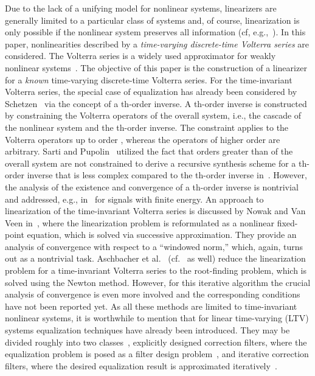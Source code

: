 \documentclass[10pt,twocolumn,twoside]{IEEEtran}
\begin{document}
Due to the lack of a unifying model for nonlinear systems, linearizers
are generally limited to a particular class of systems and, of course, linearization
is only possible if the nonlinear system preserves all information
(cf, e.g.,~\cite{geiger2011}). In this paper, nonlinearities
described by a \emph{time-varying discrete-time Volterra series} are considered. The
Volterra series is a widely used approximator for weakly nonlinear
systems~\cite{schetzen1980,rugh1981,mathews2000}. The objective of this paper is
the construction of a linearizer for a \emph{known} time-varying
discrete-time Volterra series. 
For the time-invariant Volterra series, the special case of equalization has already been
considered by Schetzen~\cite{schetzen1976} via the concept of a th-order inverse.
A th-order inverse is constructed by constraining the Volterra operators of the
overall system, i.e., the cascade of the nonlinear system and the th-order inverse. The
constraint applies to the Volterra operators up to order , whereas the operators
of higher order are arbitrary. Sarti and Pupolin~\cite{sarti1992} utilized
the fact that orders greater than  of the overall system are not constrained
to derive a recursive synthesis scheme for a th-order inverse that is less
complex compared to the th-order inverse in~\cite{schetzen1976}. However,
the analysis of the existence and convergence of a th-order inverse is
nontrivial and addressed, e.g., in~\cite{fang2001} for signals with finite energy.
An approach to linearization of the time-invariant Volterra series
is discussed by Nowak and Van Veen in~\cite{nowak1997}, where the
linearization problem is reformulated as a nonlinear fixed-point equation, which
is solved via successive approximation. They provide
an analysis of convergence with respect to a ``windowed  norm,'' which, again,
turns out as a nontrivial task. Aschbacher et al.~\cite{aschbacher2004} (cf.~\cite{redfern1998} as well)
reduce the linearization problem for a time-invariant Volterra series to
the root-finding problem, which is solved using the Newton method. However,
for this iterative algorithm the crucial analysis of convergence is even more
involved and the corresponding conditions have not been reported yet.
As all these methods are limited to time-invariant nonlinear systems, it is worthwhile
to mention that for linear time-varying (LTV) systems equalization techniques have already
been introduced. They may be divided roughly into two classes~\cite{vogel2012},
explicitly designed correction filters, where the equalization problem is posed as a
filter design problem~\cite{johansson2006,johansson2008}, and iterative correction filters,
where the desired equalization result is approximated iteratively~\cite{vogel2009,
tsui2011b,soudan2012}.
\end{document}
